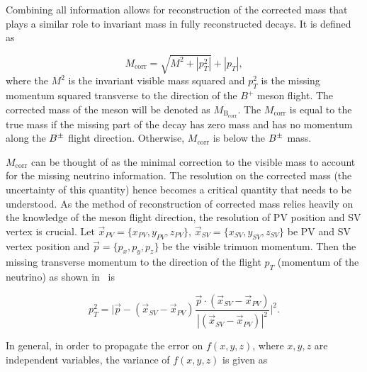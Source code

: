 Combining all information allows for reconstruction of the corrected mass that plays a similar role to invariant mass in fully reconstructed decays. It is defined as

\begin{equation}
	M_{\mathrm{corr}} = \sqrt{{M}^{2} + |p^{2}_{T}|} + |p_{T}|,
\label{eq:corrm}        
\end{equation}	
where the $M^{2}$ is the invariant visible mass squared and $p^{2}_{T}$ is the missing momentum squared transverse to the direction of the $B^{+}$ meson flight. The corrected mass of the \Bpm meson will be denoted as $M_{\mathrm{B_{corr}}}$. The $M_{\mathrm{corr}}$ is equal to the true mass if the missing part of the decay has zero mass and has no momentum along the ${{B}^\pm}$ flight direction. Otherwise, $M_{\mathrm{corr}}$ is below the ${{B}^\pm}$ mass.

$M_{\mathrm{corr}}$ can be thought of as the minimal correction to the visible mass to account for the missing neutrino information. The resolution on the corrected mass (the uncertainty of this quantity) hence becomes a critical quantity that needs to be understood. As the method of reconstruction of corrected mass relies heavily on the knowledge of the \Bpm meson flight direction, the resolution of \gls{PV} position and \gls{SV} vertex is crucial. Let $\vec{{x}}_{PV}=\{x_{PV},y_{PV},z_{PV}\}$, $\vec{{x}}_{SV}=\{x_{SV},y_{SV},z_{SV}\} $ be \gls{PV} and \gls{SV} vertex position and $\vec{p}=\{p_{x},p_{y},p_{z}\}$ be the visible trimuon momentum. Then the missing transverse momentum to the direction of the flight $p_{T}$ (momentum of the neutrino) as shown in~\cite{Egede:1694339} is


\begin{equation}
	p^{2}_{T} = \Big|\vec{p} - (\vec{{x}}_{SV}-\vec{{x}}_{PV})\frac{\vec{p} \cdot(\vec{{x}}_{SV}-\vec{{x}}_{PV})}{|(\vec{{x}}_{SV}-\vec{{x}}_{PV})|^{2}}\Big|^{2}. 
\label{eq:ptmis}
\end{equation}



In general, in order to propagate the error on $f(x,y,z)$, where $x,y,z$ are independent variables, the variance of $f(x,y,z)$ is given as

